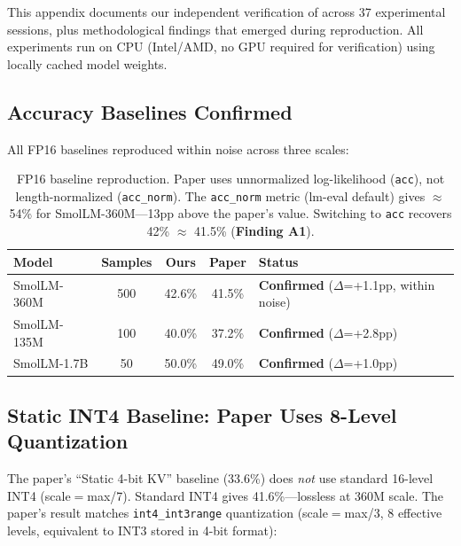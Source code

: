 \documentclass{article}
\begin{document}
This appendix documents our independent verification of \cite{haeri2026dwb} across 37 experimental sessions, plus methodological findings that emerged during reproduction. All experiments run on CPU (Intel/AMD, no GPU required for verification) using locally cached model weights.

\subsection{Accuracy Baselines Confirmed}

All FP16 baselines reproduced within noise across three scales:

\begin{table}[h]
\centering
\caption{FP16 baseline reproduction. Paper uses unnormalized log-likelihood (\texttt{acc}), not length-normalized (\texttt{acc\_norm}). The \texttt{acc\_norm} metric (lm-eval default) gives $\approx$54\% for SmolLM-360M---13pp above the paper's value. Switching to \texttt{acc} recovers 42\% $\approx$ 41.5\% (\textbf{Finding A1}).}
\begin{tabular}{lcccl}
\toprule
Model & Samples & Ours & Paper & Status \\
\midrule
SmolLM-360M & 500 & 42.6\% & 41.5\% & \textbf{Confirmed} ($\Delta$=+1.1pp, within noise) \\
SmolLM-135M & 100 & 40.0\% & 37.2\% & \textbf{Confirmed} ($\Delta$=+2.8pp) \\
SmolLM-1.7B & 50  & 50.0\% & 49.0\% & \textbf{Confirmed} ($\Delta$=+1.0pp) \\
\bottomrule
\end{tabular}
\end{table}

\subsection{Static INT4 Baseline: Paper Uses 8-Level Quantization}
\label{app:int4}

The paper's ``Static 4-bit KV'' baseline (33.6\%) does \emph{not} use standard 16-level INT4 (scale$=$max/7). Standard INT4 gives 41.6\%---lossless at 360M scale. The paper's result matches \texttt{int4\_int3range} quantization (scale$=$max/3, 8 effective levels, equivalent to INT3 stored in 4-bit format):
\end{document}
